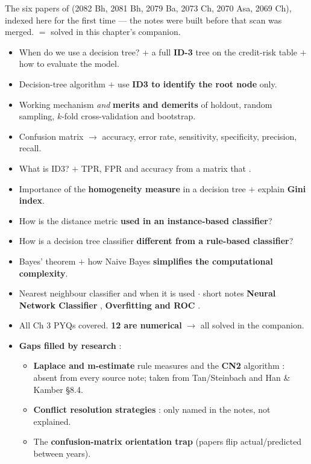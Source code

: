 {\color{sub}\footnotesize The six papers of  (2082 Bh, 2081 Bh, 2079 Ba, 2073 Ch, 2070 Asa, 2069 Ch), indexed here for the
first time --- the notes were built before that scan was merged.  $=$ solved in this chapter's companion. \added}
\begin{itemize}
  \item {} When do we use a decision tree? $+$ a full \textbf{ID-3} tree on the credit-risk table $+$ how to evaluate the model. \hfill {} 
  \item {} Decision-tree algorithm $+$ use \textbf{ID3 to identify the root node} only. \hfill {} 
  \item Working mechanism \emph{and} \textbf{merits and demerits} of holdout, random sampling, $k$-fold cross-validation and bootstrap. \hfill {}  \added
  \item {} Confusion matrix $\rightarrow$ accuracy, error rate, sensitivity, specificity, precision, recall. \hfill {} 
  \item {} What is ID3? $+$ TPR, FPR and accuracy from a matrix that . \hfill {} 
  \item Importance of the \textbf{homogeneity measure} in a decision tree $+$ explain \textbf{Gini index}. \hfill {} 
  \item How is the distance metric \textbf{used in an instance-based classifier}? \hfill {}  \added
  \item How is a decision tree classifier \textbf{different from a rule-based classifier}? \hfill {}  \added
  \item Bayes' theorem $+$ how Naive Bayes \textbf{simplifies the computational complexity}. \hfill {} 
  \item Nearest neighbour classifier and when it is used  $\cdot$ short notes \textbf{Neural Network Classifier} , \textbf{Overfitting and ROC} . \hfill {}
\end{itemize}

\begin{itemize}
  \item All Ch 3 PYQs covered. \textbf{12 are numerical} $\rightarrow$ all solved in the companion.
  \item \textbf{Gaps filled by research} \added:
  \begin{itemize}
    \item \textbf{Laplace and m-estimate} rule measures and the \textbf{CN2} algorithm :
          absent from every source note; taken from Tan/Steinbach and Han \& Kamber §8.4.
    \item \textbf{Conflict resolution strategies} : only named in the notes, not explained.
    \item The \textbf{confusion-matrix orientation trap} (papers flip actual/predicted between years).
  \end{itemize}
\end{itemize}

